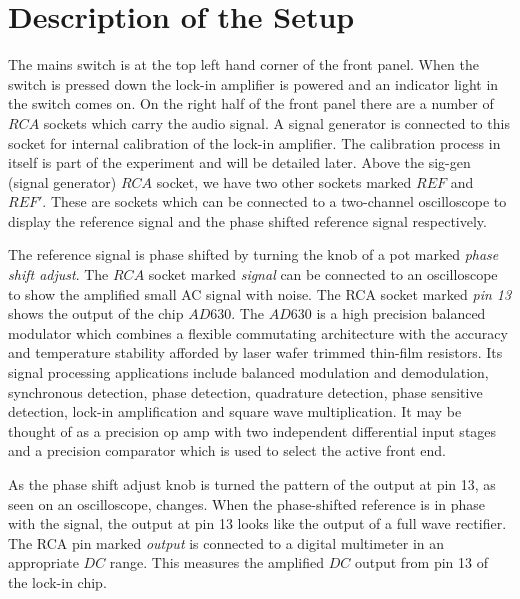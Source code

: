 \documentclass[%
 reprint,
nofootinbib,
 amsmath,amssymb,
 aps,
]{revtex4-2}
\begin{document}
\section{\label{sec:setup}Description of the Setup}
    The mains switch is at the top left hand corner of the front panel. When the switch is pressed down the lock-in amplifier is powered and an indicator light in the switch comes on. On the right half of the front panel there are a number of $RCA$ sockets which carry the audio signal. A signal generator is connected to this socket for internal calibration of the lock-in amplifier. The calibration process in itself is part of the experiment and will be detailed later. Above the sig-gen (signal generator) $RCA$ socket, we have two other sockets marked $REF$ and $REF'$. These are sockets which can be connected to a two-channel oscilloscope to display the reference signal and the phase shifted reference signal respectively.
    \par
    The reference signal is phase shifted by turning the knob of a pot marked \textit{phase shift adjust}. The $RCA$ socket marked \textit{signal} can be connected to an oscilloscope to show the amplified small AC signal with noise. The RCA socket marked \textit{pin 13} shows the output of the chip $AD630$. The $AD630$ is a high precision balanced modulator which combines a flexible commutating architecture with the accuracy and temperature stability afforded by laser wafer trimmed thin-film resistors. Its signal processing applications include balanced modulation and demodulation, synchronous detection, phase detection, quadrature detection, phase sensitive detection, lock-in amplification and square wave multiplication. It may be thought of as a precision op amp with two independent differential input stages and a precision comparator which is used to select the active front end.
    \par
    As the phase shift adjust knob is turned the pattern of the output at pin 13, as seen on an oscilloscope, changes. When the phase-shifted reference is in phase with the signal, the output at pin 13 looks like the output of a full wave rectifier. The RCA pin marked \textit{output} is connected to a digital multimeter in an appropriate $DC$ range. This measures the amplified $DC$ output from pin 13 of the lock-in chip. 
 
\end{document}
